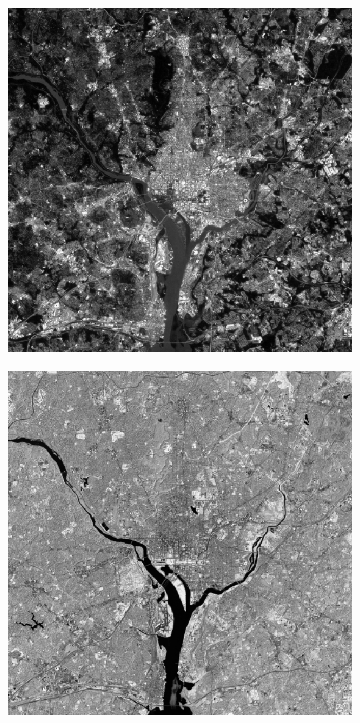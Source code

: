 \begin{figure}[h!]
	\centering
	\begin{subfigure}[b]{0.3\linewidth}
		\includegraphics[width=\linewidth]{myfigure/p10/10_components_1.png}
		\caption{}
		\label{fig:10components1}
	\end{subfigure}
	\begin{subfigure}[b]{0.3\linewidth}
		\includegraphics[width=\linewidth]{myfigure/p10/10_components_2.png}

\end{subfigure}
\end{figure}

